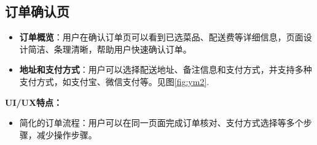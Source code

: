 \subsection{订单确认页}
\begin{itemize}
    \item \textbf{订单概览}：用户在确认订单页可以看到已选菜品、配送费等详细信息，页面设计简洁、条理清晰，帮助用户快速确认订单。
    \item \textbf{地址和支付方式}：用户可以选择配送地址、备注信息和支付方式，并支持多种支付方式，如支付宝、微信支付等。见图\ref{fig:ym2}.
\end{itemize}
 \textbf{UI/UX特点：}
\begin{itemize}
    \item 简化的订单流程：用户可以在同一页面完成订单核对、支付方式选择等多个步骤，减少操作步骤。
\end{itemize}

